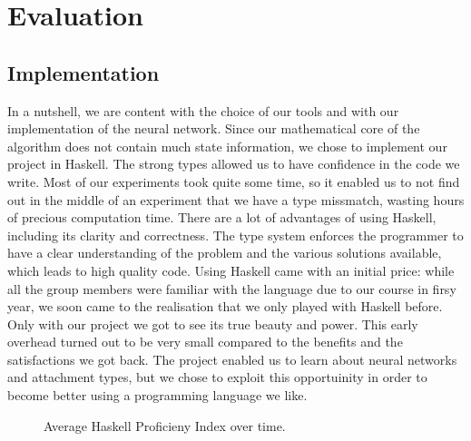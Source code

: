 \chapter{Evaluation}




\section{Implementation}


In a nutshell, we are content with the choice of our tools and with our implementation of the neural network. Since our mathematical core of the algorithm does not contain much state information, we chose to implement our project in Haskell.
The strong types allowed us to have confidence in the code we write. Most of our experiments took quite some time, so it enabled us to not find out in the middle of an experiment that we have a type missmatch, wasting hours of precious computation time.
There are a lot of advantages of using Haskell, including its clarity and correctness. The type system enforces the programmer to have a clear understanding of the problem and the various solutions available, which leads to high quality code.
Using Haskell came with an initial price: while all the group members were familiar with the language due to our course in firsy year, we soon came to the realisation that we only played with Haskell before. Only with our project we got to see its true beauty and power.
This early overhead turned out to be very small compared to the benefits and the satisfactions we got back. The project enabled us to learn about neural networks and attachment types, but we chose to exploit this opportuinity in order to become better using a programming language we like.
\begin{figure}[h]
  \centering

\caption{Average Haskell Proficieny Index over time.}
\label{fig:Haskell Proficieny Index over time}
\end{figure}

